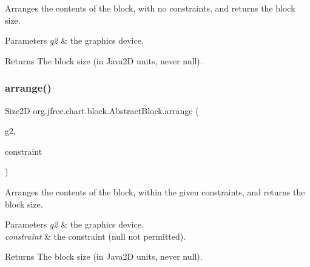 Arranges the contents of the block, with no constraints, and returns the block size.


\begin{DoxyParams}{Parameters}
{\em g2} & the graphics device.\\
\hline
\end{DoxyParams}
\begin{DoxyReturn}{Returns}
The block size (in Java2D units, never {\ttfamily null}). 
\end{DoxyReturn}
\mbox{\label{classorg_1_1jfree_1_1chart_1_1block_1_1_abstract_block_a151867f45dee9e5b69118ba6bdf93693}} 
\subsubsection{\texorpdfstring{arrange()}{arrange()}\hspace{0.1cm}{\footnotesize\ttfamily [2/2]}}
{\footnotesize\ttfamily Size2D org.\+jfree.\+chart.\+block.\+Abstract\+Block.\+arrange (\begin{DoxyParamCaption}\item[{Graphics2D}]{g2,  }\item[{\mbox{\hyperlink{classorg_1_1jfree_1_1chart_1_1block_1_1_rectangle_constraint}{Rectangle\+Constraint}}}]{constraint }\end{DoxyParamCaption})}

Arranges the contents of the block, within the given constraints, and returns the block size.


\begin{DoxyParams}{Parameters}
{\em g2} & the graphics device. \\
\hline
{\em constraint} & the constraint ({\ttfamily null} not permitted).\\
\hline
\end{DoxyParams}
\begin{DoxyReturn}{Returns}
The block size (in Java2D units, never {\ttfamily null}). 
\end{DoxyReturn}
\mbox{\label{classorg_1_1jfree_1_1chart_1_1block_1_1_abstract_block_a20c78686a8ea0f6e6c160e5ac53e237e}} 

